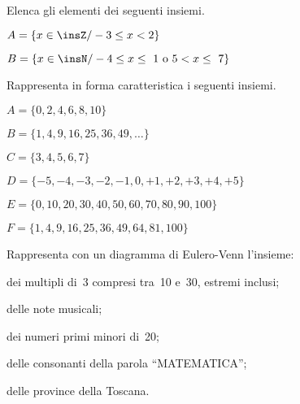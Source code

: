 \begin{esercizio}
\label{ese:6.19}
Elenca gli elementi dei seguenti insiemi.
\begin{multicols}{2}
\begin{enumeratea}
\item $A=\{x\in\insZ/-3\le x<2\}$
\item $B=\{x\in\insN/-4\le x\le~1\text{ o }5<x\le~7\}$
\end{enumeratea}
\end{multicols}
\end{esercizio}

\begin{esercizio}
\label{ese:6.20}
Rappresenta in forma caratteristica i seguenti insiemi.
\begin{enumeratea}
\item $A=\{0, 2, 4, 6, 8, 10\}$
\item $B=\{1, 4, 9, 16, 25, 36,49, \ldots\}$
\item $C=\{3, 4, 5, 6, 7\}$
\item $D=\{-5, -4, -3, -2, -1, 0, +1, +2, +3, +4, +5\}$
\item $E=\{0, 10, 20, 30, 40, 50, 60, 70, 80, 90, 100\}$
\item $F=\{1, 4, 9, 16, 25, 36, 49, 64, 81, 100\}$
\end{enumeratea}
\end{esercizio}


\begin{esercizio}
\label{ese:6.21}
Rappresenta con un diagramma di Eulero-Venn l'insieme:
\begin{enumeratea}
\item dei multipli di~3 compresi tra~10 e~30, estremi inclusi;
\item delle note musicali;
\item dei numeri primi minori di~20;
\item delle consonanti della parola ``MATEMATICA'';
\item delle province della Toscana.
\end{enumeratea}
\end{esercizio}


